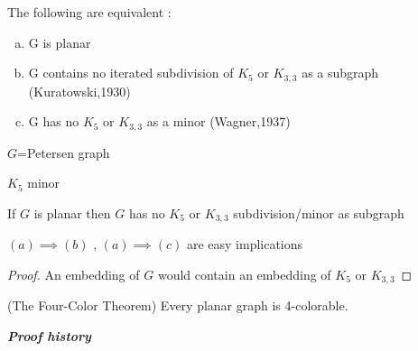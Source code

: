\begin {theorem}The following are equivalent :
\begin{minipage}[t]{\linewidth}
\begin{enumerate}[(a)]
\item {G} is planar
\item {G} contains no iterated subdivision of {$K_5$} or {$K_{3,3}$} as a subgraph 
\newline (Kuratowski,1930)
\item {G} has no {$K_5$} or {$K_{3,3}$} as a minor
\newline (Wagner,1937)
\end {enumerate}
\end {minipage}
\end {theorem}
\bigskip
\begin {example}
{$G$}=Petersen graph
{$K_5$} minor
\end {example}
\begin {remark} If {$G$} is planar then {$G$} has no {$K_5$} or {$K_{3,3}$} subdivision/minor as subgraph
\end {remark}
$(a) \implies (b)$ , $(a) \implies (c)$ are easy implications
\begin {proof} An embedding of {$G$} would contain an embedding of {$K_5$} or {$K_{3,3}$}
\end {proof}
\bigskip
\begin {theorem} (The Four-Color Theorem)
Every planar graph is 4-colorable.
\end {theorem}
\bigskip
\textbf{\textit{Proof history}}

